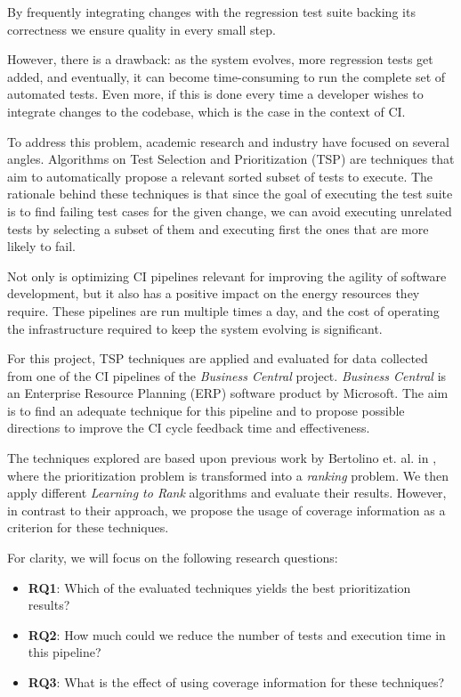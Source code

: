 By frequently integrating changes with the regression test suite backing its correctness
we ensure quality in every small step.

However, there is a drawback: as the system evolves, more regression tests
get added, and eventually, it can become time-consuming to run the complete
set of automated tests. Even more, if this is done every time a developer wishes to
integrate changes to the codebase, which is the case in the context of CI.

To address this problem, academic research and industry have focused on several angles.
Algorithms on Test Selection and Prioritization (TSP) are techniques that aim to 
automatically propose a relevant sorted subset of tests to execute. The rationale
behind these techniques is that since the goal of executing the test suite is to
find failing test cases for the given change, we can avoid executing unrelated tests
by selecting a subset of them and executing first the ones that are more likely to fail.

Not only is optimizing CI pipelines relevant for improving the agility of software development, 
but it also has a positive impact on the energy resources they require.
These pipelines are run multiple times a day, and the cost of operating the infrastructure
required to keep the system evolving is significant.

For this project, TSP techniques are applied and evaluated for data collected from one of the CI pipelines
of the \emph{Business Central} project. \emph{Business Central} is an Enterprise Resource Planning (ERP)
software product by Microsoft.  The aim is to find an adequate technique for this pipeline and to 
propose possible directions to improve the CI cycle feedback time and effectiveness.

The techniques explored are based upon previous work by Bertolino
et. al. in \cite{Bertolino2020LearningtoRankVR}, where the prioritization problem is transformed
into a \emph{ranking} problem. We then apply different \emph{Learning to Rank} algorithms and evaluate
their results. However, in contrast to their approach, we propose the usage of coverage information 
as a criterion for these techniques.

For clarity, we will focus on the following research questions:
\begin{itemize}
    \item \textbf{RQ1}: Which of the evaluated techniques yields the best prioritization results?
    \item \textbf{RQ2}: How much could we reduce the number of tests and execution time in this pipeline?
    \item \textbf{RQ3}: What is the effect of using coverage information for these techniques?
\end{itemize}

